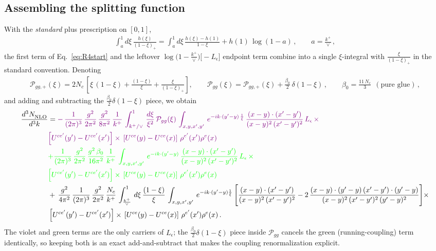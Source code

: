 \documentclass[9pt]{article}
\numberwithin{equation}{section}
\begin{document}
\subsection{Assembling the splitting function}
With the \emph{standard} plus prescription on $[0,1]$,
\begin{align}
\int_{a}^{1}d\xi\,\frac{h(\xi)}{(1-\xi)_{+}}=\int_{a}^{1}d\xi\,\frac{h(\xi)-h(1)}{1-\xi}+h(1)\,\log(1-a)\,,\qquad a=\frac{k^{+}}{\vee}\,,
\end{align}
the first term of Eq.~\eqref{eq:R4start} and the leftover
$\log\big(1-\frac{k^{+}}{\vee}\big)\big[-L_{\epsilon}\big]$ endpoint term combine into a single
$\xi$-integral with $\frac{\xi}{(1-\xi)_{+}}$ in the standard convention. Denoting
\begin{align}
\mathcal{P}_{gg,+}(\xi) = 2N_{c}\,\left[\xi\,(1-\xi)+\frac{(1-\xi)}{\xi}+\frac{\xi}{(1-\xi)_{+}}\right],\qquad
    \mathcal{P}_{gg}(\xi) = \mathcal{P}_{gg,+}(\xi) + \frac{\beta_{0}}{2}\, \delta(1-\xi)\,,\qquad \beta_{0}=\frac{11\,N_{c}}{3}\ \ (\text{pure glue})\,,
\end{align}
and adding and subtracting the $\frac{\beta_{0}}{2}\delta(1-\xi)$ piece, we obtain
\begin{align}\label{eq:R4afterPgg}
    \frac{d^{3}N_{\rm NLO}^{\rm}}{d^{3}k}  & =
   {\color{violet} -\,\frac{1}{(2\pi)^{3}}\,\frac{g^{2}}{2\pi^{2}}\,\frac{g^{2}}{8\pi^{2}}\,\frac{1}{k^{+}}\,\int_{k^{+}/\vee}^{1}\, \frac{d\xi}{\xi^{2}}\,\mathcal{P}_{gg}(\xi)\,\int_{x,y,x',y'}\, e^{-ik\cdot (y'-y)\,\frac{1}{\xi}}\, \frac{(x-y)\cdot (x'-y')}{(x-y)^{2}\,(x'-y')^{2}}\,L_{\epsilon}\,\times}\notag \\ &  {\color{violet}\left[U^{ce'}(y') - U^{ce'}(x')\right] \times\, \left[U^{ce}(y) - U^{ce}(x)\right]\, \rho^{e'}(x') \rho^{e}(x)} \notag \\ & {\color{green}+\frac{1}{(2\pi)^{3}}\, \frac{g^{2}}{2\pi^{2}}\,\frac{g^{2}\,\beta_{0}}{16\pi^{2}}\, \frac{1}{k^{+}}\,\int_{x,y,x',y'}\, e^{-ik\cdot (y'-y)}\, \frac{(x-y)\cdot (x'-y')}{(x-y)^{2}\,(x'-y')^{2}}\,L_{\epsilon}\,\times}\notag \\ &  {\color{green}\left[U^{ce'}(y') - U^{ce'}(x')\right] \times\, \left[U^{ce}(y) - U^{ce}(x)\right]\, \rho^{e'}(x') \rho^{e}(x)}\notag \\
&  +\,\frac{g^{2}}{4\pi^{2}}\, \frac{1}{(2\pi)^{3}}\,\frac{g^{2}}{2\pi^{2}}\, \frac{N_{c}}{k^{+}}\,\int_{\frac{k^{+}}{\vee}}^{1}\,d\xi\, \frac{(1-\xi)}{\xi}\, \int_{x,y,x',y'}\,e^{-ik\cdot (y'-y)\frac{1}{\xi}}\,\Bigg[\frac{(x-y)\cdot (x'-y')}{(x-y)^{2}\, (x'-y')^{2}} -2\,\frac{(x-y)\cdot (y'-y)\, (x'-y')\cdot (y'-y)}{(x-y)^{2}\,(x'-y')^{2}\,(y'-y)^{2}}\Bigg]\times\notag \\ &  \left[U^{ce'}(y') - U^{ce'}(x')\right] \times\, \left[U^{ce}(y) - U^{ce}(x)\right]\, \rho^{e'}(x') \rho^{e}(x)\,.
\end{align}
The violet and green terms are the only carriers of $L_{\epsilon}$; the
$\frac{\beta_{0}}{2}\delta(1-\xi)$ piece inside $\mathcal{P}_{gg}$ cancels the green (running-coupling)
term identically, so keeping both is an exact add-and-subtract that makes the coupling
renormalization explicit.
\end{document}
